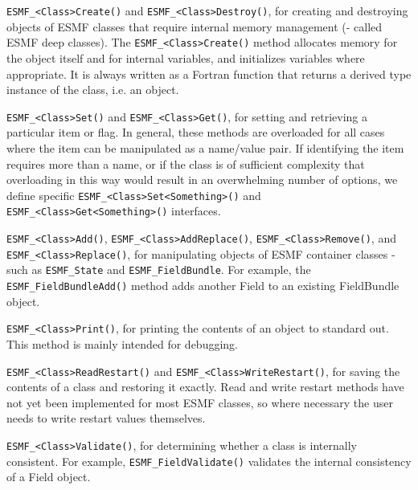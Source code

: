 \begin{itemize}

\item 
\begin{sloppypar}
{\tt ESMF\_<Class>Create()} and {\tt ESMF\_<Class>Destroy()}, for
creating and destroying objects of ESMF classes that require internal memory
management (- called ESMF deep classes). The {\tt ESMF\_<Class>Create()} method
allocates memory for the object itself and for internal variables, and
initializes variables where appropriate.  It is always written as a Fortran
function that returns a derived type instance of the class, i.e. an object.
\end{sloppypar}

\item 
\begin{sloppypar}
{\tt ESMF\_<Class>Set()} and {\tt ESMF\_<Class>Get()}, for setting and 
retrieving a particular item or flag.  In general, these methods are overloaded
for all cases where the item can be manipulated as a name/value pair.  If
identifying the item requires more than a name, or if the class is of
sufficient complexity that overloading in this way would result in an
overwhelming number of options, we define specific
{\tt ESMF\_<Class>Set<Something>()} and {\tt ESMF\_<Class>Get<Something>()}
interfaces.
\end{sloppypar}

\begin{sloppypar}
\item {\tt ESMF\_<Class>Add()}, {\tt ESMF\_<Class>AddReplace()},
{\tt ESMF\_<Class>Remove()}, and {\tt ESMF\_<Class>Replace()}, for manipulating
objects of ESMF container classes - such as {\tt ESMF\_State} and
{\tt ESMF\_FieldBundle}. For example, the {\tt ESMF\_FieldBundleAdd()}
method adds another Field to an existing FieldBundle object.
\end{sloppypar}

\item {\tt ESMF\_<Class>Print()}, for printing the contents of an object to 
standard out.  This method is mainly intended for debugging.

\item {\tt ESMF\_<Class>ReadRestart()} and {\tt ESMF\_<Class>WriteRestart()}, 
for saving the contents of a class and restoring it exactly.  Read
and write restart methods have not yet been implemented for most
ESMF classes, so where necessary the user needs to write restart 
values themselves.

\item 
\begin{sloppypar}
{\tt ESMF\_<Class>Validate()}, for determining whether a class is 
internally consistent.  For example, {\tt ESMF\_FieldValidate()} validates
the internal consistency of a Field object.
\end{sloppypar}

\end{itemize}

